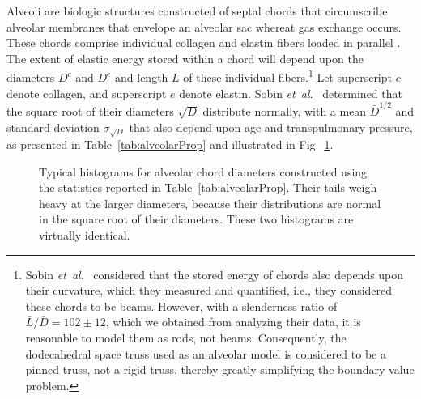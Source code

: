 Alveoli are biologic structures constructed of septal chords that circumscribe alveolar membranes that envelope an alveolar sac whereat gas exchange occurs.  These chords comprise individual collagen and elastin fibers loaded in parallel \cite{Matsudaetal87,Sobinetal88}.  The extent of elastic energy stored within a chord will depend upon the diameters $D^c$ and $D^e$ and length $L$ of these individual fibers.\footnote{
	Sobin \textit{et~al}.\ \cite{Sobinetal88} considered that the stored energy of chords also depends upon their curvature, which they measured and quantified, i.e., they considered these chords to be beams.  However, with a slenderness ratio of $\bar{L}/\bar{D} = 102 \pm 12$, which we obtained from analyzing their data, it is reasonable to model them as rods, not beams.  Consequently, the dodecahedral space truss used as an alveolar model is considered to be a pinned truss, not a rigid truss, thereby greatly simplifying the boundary value problem.
}
Let superscript $c$ denote collagen, and superscript $e$ denote elastin.  Sobin \textit{et~al}.\ \cite{Sobinetal88} determined that the square root of their diameters $\sqrt{D}$ distribute normally, with a mean $\bar{D}^{1/2}$ and standard deviation $\sigma_{\sqrt{D}}$ that also depend upon age and transpulmonary pressure, as presented in Table~\ref{tab:alveolarProp} and illustrated in Fig.~\ref{fig:septalChordStats}. 

\begin{figure}
    \centering
    \hfill
    \caption{Typical histograms for alveolar chord diameters constructed using the statistics reported in Table~\ref{tab:alveolarProp}.  Their tails weigh heavy at the larger diameters, because their distributions are normal in the square root of their diameters.  These two histograms are virtually identical.}
    \label{fig:septalChordStats}
\end{figure}

